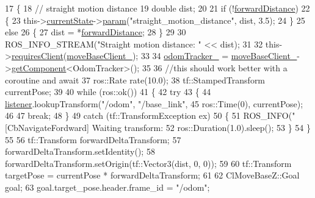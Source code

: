 \begin{DoxyCode}
17 \{
18     \textcolor{comment}{// straight motion distance}
19     \textcolor{keywordtype}{double} dist;
20 
21     \textcolor{keywordflow}{if} (!\hyperlink{classmove__base__z__client_1_1CbNavigateForward_ab3097d686b5a82b4f650bc5175d8ab73}{forwardDistance})
22     \{
23         this->\hyperlink{classsmacc_1_1SmaccClientBehavior_af76fc9b877542ed5caf033f820c107d0}{currentState}->\hyperlink{classsmacc_1_1ISmaccState_a4982f2187ed6da337462721146e8ef70}{param}(\textcolor{stringliteral}{"straight\_motion\_distance"}, dist, 3.5);
24     \}
25     \textcolor{keywordflow}{else}
26     \{
27         dist = *\hyperlink{classmove__base__z__client_1_1CbNavigateForward_ab3097d686b5a82b4f650bc5175d8ab73}{forwardDistance};
28     \}
29 
30     ROS\_INFO\_STREAM(\textcolor{stringliteral}{"Straight motion distance: "} << dist);
31 
32     this->\hyperlink{classsmacc_1_1SmaccClientBehavior_a917f001e763a1059af337bf4e164f542}{requiresClient}(\hyperlink{classmove__base__z__client_1_1CbNavigateForward_ab3b4592cd7f30b490a0549f2ee67c389}{moveBaseClient\_});
33 
34     \hyperlink{classmove__base__z__client_1_1CbNavigateForward_a1472ca04aac37644667e8833668a5bab}{odomTracker\_} = \hyperlink{classmove__base__z__client_1_1CbNavigateForward_ab3b4592cd7f30b490a0549f2ee67c389}{moveBaseClient\_}->\hyperlink{classsmacc_1_1ISmaccClient_adef78db601749ca63c19e74a27cb88cc}{getComponent}<OdomTracker>();
35 
36     \textcolor{comment}{//this should work better with a coroutine and await}
37     ros::Rate rate(10.0);
38     tf::StampedTransform currentPose;
39 
40     \textcolor{keywordflow}{while} (ros::ok())
41     \{
42         \textcolor{keywordflow}{try}
43         \{
44             \hyperlink{classmove__base__z__client_1_1CbNavigateForward_afa40fd805d66eb09e9b4b1bd8356b2a5}{listener}.lookupTransform(\textcolor{stringliteral}{"/odom"}, \textcolor{stringliteral}{"/base\_link"},
45                                      ros::Time(0), currentPose);
46 
47             \textcolor{keywordflow}{break};
48         \}
49         \textcolor{keywordflow}{catch} (tf::TransformException ex)
50         \{
51             ROS\_INFO(\textcolor{stringliteral}{"[CbNavigateFordward] Waiting transform: %
52             ros::Duration(1.0).sleep();
53         \}
54     \}
55 
56     tf::Transform forwardDeltaTransform;
57     forwardDeltaTransform.setIdentity();
58     forwardDeltaTransform.setOrigin(tf::Vector3(dist, 0, 0));
59 
60     tf::Transform targetPose = currentPose * forwardDeltaTransform;
61 
62     ClMoveBaseZ::Goal goal;
63     goal.target\_pose.header.frame\_id = \textcolor{stringliteral}{"/odom"};
}
\end{DoxyCode}
